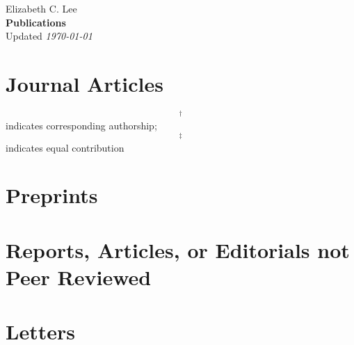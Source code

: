 \documentclass[martgin, line, 11pt]{article}
\begin{document}
\begin{flushright}
  {\large Elizabeth C. Lee}\\
  {\large \textbf{Publications}}\\
  Updated \textit{\today}
\end{flushright}

\section*{Journal Articles}

\begin{footnotesize}
    $$^\dagger$$ indicates corresponding authorship;
    $$^\ddagger$$ indicates equal contribution
  \end{footnotesize}

\begin{enumerate}
  
\end{enumerate}

\section*{Preprints}

\begin{enumerate}
  
\end{enumerate}

\section*{Reports, Articles, or Editorials not Peer Reviewed}

\begin{enumerate}
  
\end{enumerate}


%   

\section*{Letters}

\begin{enumerate}
  
\end{enumerate}
\end{document}
